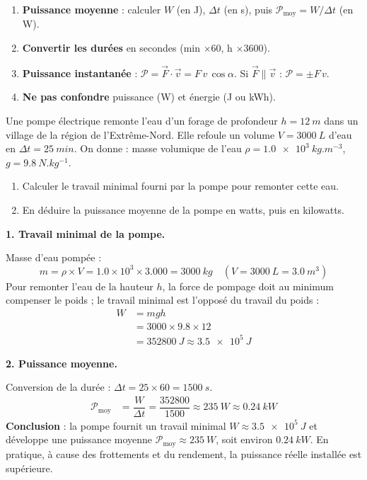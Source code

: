 \documentclass[11pt]{article}
\begin{document}
\begin{methode}
\begin{enumerate}
\item \textbf{Puissance moyenne} : calculer $W$ (en J), $\Delta t$ (en s), puis $\mathcal{P}_{\text{moy}} = W/\Delta t$ (en W).
\item \textbf{Convertir les durées} en secondes (min $\times 60$, h $\times 3600$).
\item \textbf{Puissance instantanée} : $\mathcal{P} = \vec{F}\cdot\vec{v} = F\,v\,\cos\alpha$. Si $\vec{F}\parallel\vec{v}$ : $\mathcal{P} = \pm F\,v$.
\item \textbf{Ne pas confondre} puissance (W) et énergie (J ou kWh).
\end{enumerate}
\end{methode}

\begin{exoresolu}
Une pompe électrique remonte l'eau d'un forage de profondeur $h = \SI{12}{m}$ dans un village de la région de l'Extrême-Nord. Elle refoule un volume $V = \SI{3000}{L}$ d'eau en $\Delta t = \SI{25}{min}$. On donne : masse volumique de l'eau $\rho = \SI{1.0e3}{kg.m^{-3}}$, $g = \SI{9.8}{N.kg^{-1}}$.
\begin{enumerate}
\item Calculer le travail minimal fourni par la pompe pour remonter cette eau.
\item En déduire la puissance moyenne de la pompe en watts, puis en kilowatts.
\end{enumerate}
\tcblower
\textbf{1. Travail minimal de la pompe.}

Masse d'eau pompée :
\[ m = \rho \times V = 1.0\times 10^{3} \times 3.000 = \SI{3000}{kg} \quad (V = \SI{3000}{L} = \SI{3.0}{m^3}) \]
Pour remonter l'eau de la hauteur $h$, la force de pompage doit au minimum compenser le poids ; le travail minimal est l'opposé du travail du poids :
\begin{align*}
W &= mgh \\
&= 3000 \times 9.8 \times 12 \\
&= \SI{352800}{J} \approx \SI{3.5e5}{J}
\end{align*}

\textbf{2. Puissance moyenne.}

Conversion de la durée : $\Delta t = 25 \times 60 = \SI{1500}{s}$.
\begin{align*}
\mathcal{P}_{\text{moy}} &= \dfrac{W}{\Delta t} = \dfrac{352800}{1500} \approx \SI{235}{W} \approx \SI{0.24}{kW}
\end{align*}
\textbf{Conclusion} : la pompe fournit un travail minimal $W \approx \SI{3.5e5}{J}$ et développe une puissance moyenne $\mathcal{P}_{\text{moy}} \approx \SI{235}{W}$, soit environ $\SI{0.24}{kW}$. En pratique, à cause des frottements et du rendement, la puissance réelle installée est supérieure.
\end{exoresolu}
\end{document}
